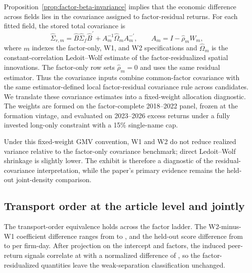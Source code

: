 Proposition~\ref{prop:factor-beta-invariance} implies that the economic
difference across fields lies in the covariance assigned to factor-residual
returns. For each fitted field, the stored total covariance is
\begin{equation}
  \widehat{\Sigma}_{r,m}
  =\widehat{B}\widehat{\Sigma}_{f}\widehat{B}^{\prime}
  + A_m^{-1}\widehat{\Omega}_m A_m^{-\prime},
  \qquad A_m=I-\hat\rho_m W_m,
  \label{eq:app-gmv-covariance}
\end{equation}
where $m$ indexes the factor-only, W1, and W2 specifications and
$\widehat{\Omega}_m$ is the constant-correlation Ledoit--Wolf estimate of the
factor-residualized spatial innovations. The factor-only row sets
$\hat\rho_m=0$ and uses the same residual estimator. Thus the covariance inputs
combine common-factor covariance with the same estimator-defined local
factor-residual covariance rule across candidates.
We translate these covariance estimates into a fixed-weight allocation
diagnostic. The weights are formed on the factor-complete 2018--2022 panel,
frozen at the formation vintage, and evaluated on 2023--2026 excess returns
under a fully invested long-only constraint with a 15\% single-name cap.



Under this fixed-weight GMV convention, W1 and W2 do not reduce realized
variance relative to the factor-only covariance benchmark; direct
Ledoit--Wolf shrinkage is slightly lower. The exhibit is therefore a diagnostic
of the residual-covariance interpretation, while the paper's primary evidence
remains the held-out joint-density comparison.

\subsection{Transport order at the article level and jointly}
\label{sec:app-transport-order}

The transport-order equivalence holds across the factor ladder.
The W2-minus-W1 coefficient difference ranges from
 to
, and the held-out score difference
from  to
 per firm-day.
After projection on the intercept and factors, the induced peer-return signals
correlate at
 with a normalized
difference of
, so the
factor-residualized quantities leave the weak-separation classification
unchanged.

